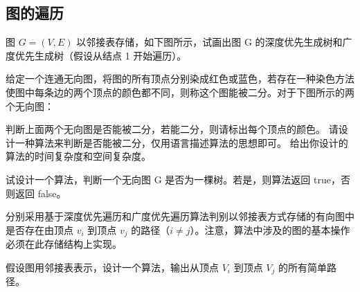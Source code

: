 \subsection{图的遍历}
\begin{qitems}
    \begin{bbox}
        \qitem 图 $G=(V,E)$ 以邻接表存储，如下图所示，试画出图 G 的深度优先生成树和广度优先生成树（假设从结点 1 开始遍历）。
    \end{bbox}

    \begin{bbox}
        \qitem 给定一个连通无向图，将图的所有顶点分别染成红色或蓝色，若存在一种染色方法使图中每条边的两个顶点的颜色都不同，则称这个图能被二分。对于下图所示的两个无向图：
        \begin{subqitems}
            \subqitem 判断上面两个无向图是否能被二分，若能二分，则请标出每个顶点的颜色。
            \subqitem 请设计一种算法来判断是否能被二分，仅用语言描述算法的思想即可。
            \subqitem 给出你设计的算法的时间复杂度和空间复杂度。
        \end{subqitems}
    \end{bbox}
    \begin{bbox}
        \qitem 试设计一个算法，判断一个无向图 G 是否为一棵树。若是，则算法返回 true，否则返回 false。
    \end{bbox}

    \begin{bbox}
        \qitem 分别采用基于深度优先遍历和广度优先遍历算法判别以邻接表方式存储的有向图中是否存在由顶点 $v_i$ 到顶点 $v_j$ 的路径（$i \neq j$）。注意，算法中涉及的图的基本操作必须在此存储结构上实现。
    \end{bbox}

    \begin{bbox}
        \qitem 假设图用邻接表表示，设计一个算法，输出从顶点 $V_i$ 到顶点 $V_j$ 的所有简单路径。
    \end{bbox}
\end{qitems}